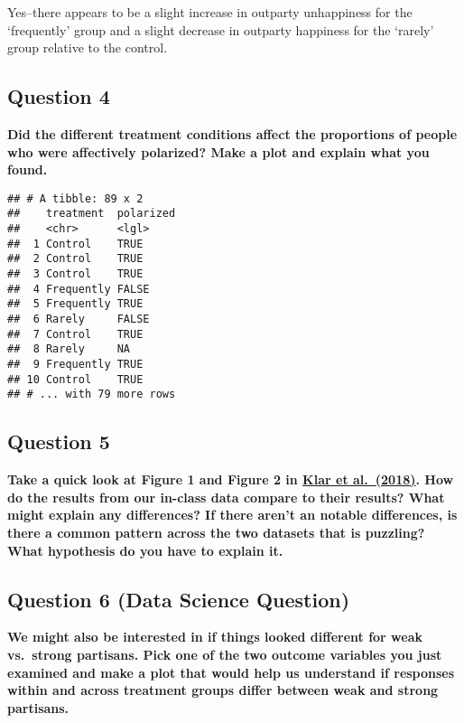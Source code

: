 \documentclass[
]{article}
\begin{document}
Yes--there appears to be a slight increase in outparty unhappiness for
the `frequently' group and a slight decrease in outparty happiness for
the `rarely' group relative to the control.

\hypertarget{question-4}{%
\subsection{Question 4}\label{question-4}}

\textbf{Did the different treatment conditions affect the proportions of
people who were affectively polarized? Make a plot and explain what you
found.}

\begin{verbatim}
## # A tibble: 89 x 2
##    treatment  polarized
##    <chr>      <lgl>    
##  1 Control    TRUE     
##  2 Control    TRUE     
##  3 Control    TRUE     
##  4 Frequently FALSE    
##  5 Frequently TRUE     
##  6 Rarely     FALSE    
##  7 Control    TRUE     
##  8 Rarely     NA       
##  9 Frequently TRUE     
## 10 Control    TRUE     
## # ... with 79 more rows
\end{verbatim}

\hypertarget{question-5}{%
\subsection{Question 5}\label{question-5}}

\textbf{Take a quick look at Figure 1 and Figure 2 in
\href{https://academic.oup.com/poq/article-abstract/82/2/379/4996003}{Klar
et al.~(2018)}. How do the results from our in-class data compare to
their results? What might explain any differences? If there aren't an
notable differences, is there a common pattern across the two datasets
that is puzzling? What hypothesis do you have to explain it.}

\hypertarget{question-6-data-science-question}{%
\subsection{Question 6 (Data Science
Question)}\label{question-6-data-science-question}}

\textbf{We might also be interested in if things looked different for
weak vs.~strong partisans. Pick one of the two outcome variables you
just examined and make a plot that would help us understand if responses
within and across treatment groups differ between weak and strong
partisans.}
\end{document}
